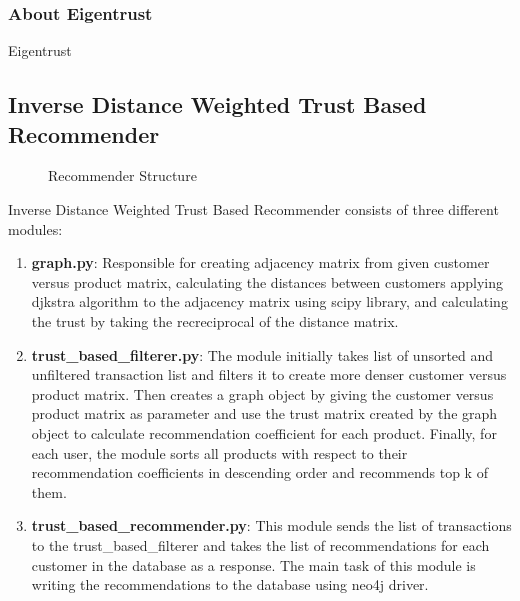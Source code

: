 \documentclass[12pt]{article}
\begin{document}
\subsubsection{About Eigentrust}
Eigentrust\cite{Eigentrust}
\subsection{Inverse Distance Weighted Trust Based Recommender}
\begin{figure}[H]
\centering
{}
\caption{Recommender Structure}
\end{figure}
Inverse Distance Weighted Trust Based Recommender consists of three different modules: \\
\begin{enumerate}
\item \textbf{graph.py}: Responsible for creating adjacency matrix from given customer versus product matrix, calculating the distances between customers applying djkstra algorithm to the adjacency matrix using scipy library, and calculating the trust by taking the recreciprocal of the distance matrix.
\item \textbf{trust\_based\_filterer.py}: The module initially takes list of unsorted and unfiltered transaction list and filters it to create more denser customer versus product matrix. Then creates a graph object by giving the customer versus product matrix as parameter and use the trust matrix created by the graph object to calculate recommendation coefficient for each product. Finally, for each user, the module sorts all products with respect to their recommendation coefficients in descending order and recommends top k of them.
\item \textbf{trust\_based\_recommender.py}: This module sends the list of transactions to the trust\_based\_filterer and takes the list of recommendations for each customer in the database as a response. The main task of this module is writing the recommendations to the database using neo4j driver.
\end{enumerate}
\end{document}
